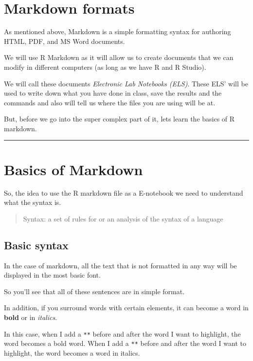 \documentclass[
]{book}
\begin{document}
\hypertarget{markdown-formats}{%
\section{Markdown formats}\label{markdown-formats}}

As mentioned above, Markdown is a simple formatting syntax for authoring HTML, PDF, and MS Word documents.

We will use R Markdown as it will allow us to create documents that we can modify in different computers (as long as we have R and R Studio).

We will call these documents \emph{Electronic Lab Notebooks (ELS)}. These ELS' will be used to write down what you have done in class, save the results and the commands and also will tell us where the files you are using will be at.

But, before we go into the super complex part of it, lets learn the basics of R markdown.

\begin{center}\rule{0.5\linewidth}{0.5pt}\end{center}

\hypertarget{basics-of-markdown}{%
\section{Basics of Markdown}\label{basics-of-markdown}}

So, the idea to use the R markdown file as a E-notebook we need to understand what the syntax is.

\begin{quote}
Syntax: a set of rules for or an analysis of the syntax of a language
\end{quote}

\hypertarget{basic-syntax}{%
\subsection{Basic syntax}\label{basic-syntax}}

In the case of markdown, all the text that is not formatted in any way will be displayed in the most basic font.

So you'll see that all of these sentences are in simple format.

In addition, if you surround words with certain elements, it can become a word in \textbf{bold} or in \emph{italics}.

In this case, when I add a \texttt{**} before and after the word I want to highlight, the word becomes a bold word. When I add a \texttt{**} before and after the word I want to highlight, the word becomes a word in italics.
\end{document}
